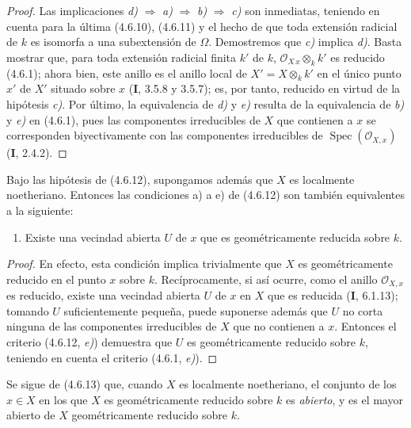 \begin{proof}
Las implicaciones \emph{d)} $\Rightarrow$ \emph{a)} $\Rightarrow$ \emph{b)} $\Rightarrow$ \emph{c)} son
inmediatas, teniendo en cuenta para la última (4.6.10), (4.6.11) y el hecho de
que toda extensión radicial de $k$ es isomorfa a una subextensión de
$\Omega$. Demostremos que \emph{c)} implica \emph{d)}. Basta mostrar que, para toda
extensión radicial finita $k'$ de $k$, $\mathcal O_{X\,x}\otimes_k k'$ es
reducido (4.6.1); ahora bien, este anillo es el anillo local de
$X'=X\otimes_k k'$ en el único punto $x'$ de $X'$ situado sobre $x$
(\textbf I, 3.5.8 y 3.5.7); es, por tanto, reducido en virtud de la hipótesis \emph{c)}. Por
último, la equivalencia de \emph{d)} y \emph{e)} resulta de la equivalencia de \emph{b)} y \emph{e)} en
(4.6.1), pues las componentes irreducibles de $X$ que contienen a $x$ se
corresponden biyectivamente con las componentes irreducibles de
$\operatorname{Spec}(\mathcal O_{X,x})$ (\textbf I, 2.4.2).
\end{proof}

\begin{corollary}[4.6.13]
\label{IV.2.4.6.13-fr}
Bajo las hipótesis de \textup{(4.6.12)}, supongamos además que $X$ es localmente
noetheriano. Entonces las condiciones a) a e) de \textup{(4.6.12)} son también
equivalentes a la siguiente:
\begin{enumerate}
\item[\textup{f)}] Existe una vecindad abierta $U$ de $x$ que es geométricamente
reducida sobre $k$.
\end{enumerate}
\end{corollary}

\begin{proof}
En efecto, esta condición implica trivialmente que $X$ es geométricamente
reducido en el punto $x$ sobre $k$. Recíprocamente, si así ocurre, como el
anillo $\mathcal O_{X,x}$ es reducido, existe una vecindad abierta $U$ de $x$
en $X$ que es reducida (\textbf I, 6.1.13); tomando $U$ suficientemente pequeña,
puede suponerse además que $U$ no corta ninguna de las componentes
irreducibles de $X$ que no contienen a $x$. Entonces el criterio (4.6.12, \emph{e)})
demuestra que $U$ es geométricamente reducido sobre $k$, teniendo en cuenta
el criterio (4.6.1, \emph{e)}).
\end{proof}

Se sigue de (4.6.13) que, cuando $X$ es localmente noetheriano, el conjunto de
los $x\in X$ en los que $X$ es geométricamente reducido sobre $k$ es
\emph{abierto}, y es el mayor abierto de $X$ geométricamente reducido sobre
$k$.

